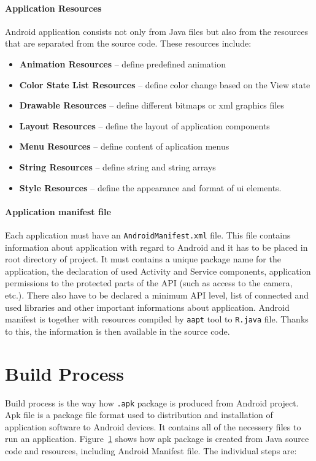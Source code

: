 \paragraph{Application Resources}
Android application consists not only from Java files but also from the resources that are separated from the source code. These resources include:
\begin{itemize}
\item \textbf{Animation Resources} -- define predefined animation
\item \textbf{Color State List Resources} -- define color change based on the View state
\item \textbf{Drawable Resources} -- define different bitmaps or xml graphics files
\item \textbf{Layout Resources} -- define the layout of application components
\item \textbf{Menu Resources} -- define content of aplication menus
\item \textbf{String Resources} -- define string and string arrays
\item \textbf{Style Resources} -- define the appearance and format of ui elements.
\end{itemize}

\paragraph{Application manifest file}
Each application must have an \texttt{AndroidManifest.xml} file. This file contains information about application with regard to Android and it has to be placed in root directory of project. It must contains a unique package name for the application, the declaration of used Activity and Service components, application permissions to the protected parts of the API (such as access to the camera, etc.). There also have to be declared a minimum API level, list of connected and used libraries and other important informations about application. Android manifest is together with resources compiled by \texttt{aapt} tool to \texttt{R.java} file. Thanks to this, the information is then available in the source code.

\section{Build Process}\label{buildProcess}
Build process is the way how \texttt{.apk} package is produced from Android project. Apk file is a package file format used to distribution and installation of application software to Android devices. It contains all of the necessery files to run an application. Figure~\ref{buildProcess} shows how apk package is created from Java source code and resources, including Android Manifest file. The individual steps are:

